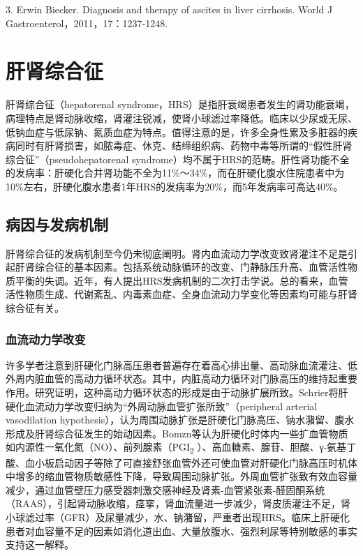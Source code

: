 3. Erwin Biecker. Diagnosis and therapy of ascites in liver cirrhosis.
World J Gastroenterol，2011，17：1237-1248.

\protect\hypertarget{text00330.html}{}{}

\section{肝肾综合征}

肝肾综合征（hepatorenal
syndrome，HRS）是指肝衰竭患者发生的肾功能衰竭，病理特点是肾动脉收缩，肾灌注锐减，使肾小球滤过率降低。临床以少尿或无尿、低钠血症与低尿钠、氮质血症为特点。值得注意的是，许多全身性累及多脏器的疾病同时有肝肾损害，如脓毒症、休克、结缔组织病、药物中毒等所谓的“假性肝肾综合征”（pseudohepatorenal
syndrome）均不属于HRS的范畴。肝性肾功能不全的发病率：肝硬化合并肾功能不全为11\%～34\%，而在肝硬化腹水住院患者中为10\%左右，肝硬化腹水患者1年HRS的发病率为20\%，而5年发病率可高达40\%。

\subsection{病因与发病机制}

肝肾综合征的发病机制至今仍未彻底阐明。肾内血流动力学改变致肾灌注不足是引起肝肾综合征的基本因素。包括系统动脉循环的改变、门静脉压升高、血管活性物质平衡的失调。近年，有人提出HRS发病机制的二次打击学说。总的看来，血管活性物质生成、代谢紊乱、内毒素血症、全身血流动力学变化等因素均可能与肝肾综合征有关。

\subsubsection{血流动力学改变}

许多学者注意到肝硬化门脉高压患者普遍存在着高心排出量、高动脉血流灌注、低外周内脏血管的高动力循环状态。其中，内脏高动力循环对门脉高压的维持起重要作用。研究证明，这种高动力循环状态的形成是由于动脉扩展所致。Schrier将肝硬化血流动力学改变归纳为“外周动脉血管扩张所致”（peripheral
arterial vasodilation
hypothesis），认为周围动脉扩张是肝硬化门脉高压、钠水潴留、腹水形成及肝肾综合征发生的始动因素。Bomzn等认为肝硬化时体内一些扩血管物质如内源性一氧化氮（NO）、前列腺素（PGI\textsubscript{2}
）、高血糖素、腺苷、胆酸、γ-氨基丁酸、血小板启动因子等除了可直接舒张血管外还可使血管对肝硬化门脉高压时机体中增多的缩血管物质敏感性下降，导致周围动脉扩张。外周血管扩张致有效血容量减少，通过血管壁压力感受器刺激交感神经及肾素-血管紧张素-醛固酮系统（RAAS），引起肾动脉收缩，痉挛，肾血流量进一步减少，肾皮质灌注不足，肾小球滤过率（GFR）及尿量减少，水、钠潴留，严重者出现HRS。临床上肝硬化患者对血容量不足的因素如消化道出血、大量放腹水、强烈利尿等特别敏感的事实支持这一解释。

